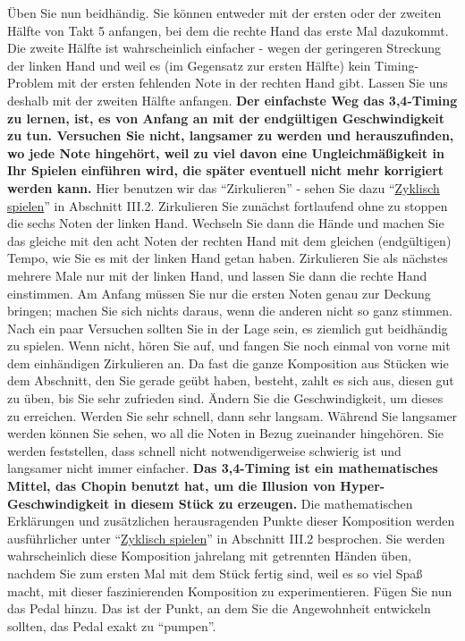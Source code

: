 Üben Sie nun beidhändig.
Sie können entweder mit der ersten oder der zweiten Hälfte von Takt 5 anfangen, bei dem die rechte Hand das erste Mal dazukommt.
Die zweite Hälfte ist wahrscheinlich einfacher - wegen der geringeren Streckung der linken Hand und weil es (im Gegensatz zur ersten Hälfte) kein Timing-Problem mit der ersten fehlenden Note in der rechten Hand gibt.
Lassen Sie uns deshalb mit der zweiten Hälfte anfangen.
\textbf{Der einfachste Weg das 3,4-Timing zu lernen, ist, es von Anfang an mit der endgültigen Geschwindigkeit zu tun.
Versuchen Sie nicht, langsamer zu werden und herauszufinden, wo jede Note hingehört, weil zu viel davon eine Ungleichmäßigkeit in Ihr Spielen einführen wird, die später eventuell nicht mehr korrigiert werden kann.}
Hier benutzen wir das \enquote{Zirkulieren} - sehen Sie dazu \enquote{\hyperref[c1iii2]{Zyklisch spielen}} in Abschnitt III.2.
Zirkulieren Sie zunächst fortlaufend ohne zu stoppen die sechs Noten der linken Hand.
Wechseln Sie dann die Hände und machen Sie das gleiche mit den acht Noten der rechten Hand mit dem gleichen (endgültigen) Tempo, wie Sie es mit der linken Hand getan haben.
Zirkulieren Sie als nächstes mehrere Male nur mit der linken Hand, und lassen Sie dann die rechte Hand einstimmen.
Am Anfang müssen Sie nur die ersten Noten genau zur Deckung bringen; machen Sie sich nichts daraus, wenn die anderen nicht so ganz stimmen.
Nach ein paar Versuchen sollten Sie in der Lage sein, es ziemlich gut beidhändig zu spielen.
Wenn nicht, hören Sie auf, und fangen Sie noch einmal von vorne mit dem einhändigen Zirkulieren an.
Da fast die ganze Komposition aus Stücken wie dem Abschnitt, den Sie gerade geübt haben, besteht, zahlt es sich aus, diesen gut zu üben, bis Sie sehr zufrieden sind.
Ändern Sie die Geschwindigkeit, um dieses zu erreichen.
Werden Sie sehr schnell, dann sehr langsam.
Während Sie langsamer werden können Sie sehen, wo all die Noten in Bezug zueinander hingehören.
Sie werden feststellen, dass schnell nicht notwendigerweise schwierig ist und langsamer nicht immer einfacher.
\textbf{Das 3,4-Timing ist ein mathematisches Mittel, das Chopin benutzt hat, um die Illusion von Hyper-Geschwindigkeit in diesem Stück zu erzeugen.}
Die mathematischen Erklärungen und zusätzlichen herausragenden Punkte dieser Komposition werden ausführlicher unter \enquote{\hyperref[c1iii2]{Zyklisch spielen}} in Abschnitt III.2 besprochen.
Sie werden wahrscheinlich diese Komposition jahrelang mit getrennten Händen üben, nachdem Sie zum ersten Mal mit dem Stück fertig sind, weil es so viel Spaß macht, mit dieser faszinierenden Komposition zu experimentieren.
Fügen Sie nun das Pedal hinzu.
Das ist der Punkt, an dem Sie die Angewohnheit entwickeln sollten, das Pedal exakt zu \enquote{pumpen}.

